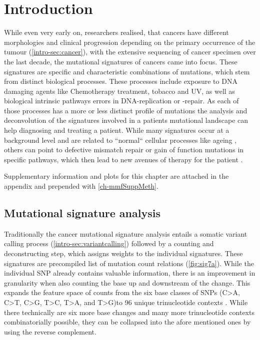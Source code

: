 \section{Introduction}
\label{mmf-sec:intro}

While even very early on, researchers realised, that cancers have different morphologies and clinical progression depending on the primary occurrence of the tumour (\autoref{intro-sec:cancer}), with the extensive sequencing of cancer specimen over the last decade, the mutational signatures of cancers came into focus. These signatures are specific and characteristic combinations of mutations, which stem from distinct biological processes. These processes include exposure to DNA damaging agents like Chemotherapy treatment, tobacco and UV, as well as biological intrinsic pathways errors in DNA-replication or -repair. As each of those processes has a more or less distinct profile of mutations \cite{Hollstein1991,Kucab2019} the analysis and deconvolution of the signatures involved in a patients mutational landscape can help diagnosing and treating a patient. While many signatures occur at a background level and are related to ``normal`` cellular processes like ageing \cite{Alexandrov2013}, others can point to defective mismatch repair or gain of function mutations in specific pathways, which then lead to new avenues of therapy for the patient \cite{Neil2017}.

Supplementary information and plots for this chapter are attached in the appendix and prepended with \ref{ch-mmfSuppMeth}.

\subsection{Mutational signature analysis}
\label{mmf-sec:signatureanalysis}
Traditionally the cancer mutational signature analysis entails a somatic variant calling process (\autoref{intro-sec:variantcalling}) followed by a counting and deconstructing step, which assigns weights to the individual signatures. These signatures are precompiled list of mutation count relations (\autoref{fig:sig7a}). While the individual SNP already contains valuable information, there is an improvement in granularity when also counting the base up and downstream of the change. This expands the feature space of counts from the six base classes of SNPs (C>A, C>T, C>G, T>C, T>A, and T>G)to 96 unique trinucleotide contexts \cite{Alexandrov2013}. While there technically are six more base changes and many more trinucleotide contexts combinatorially possible, they can be collapsed into the afore mentioned ones by using the reverse complement.

